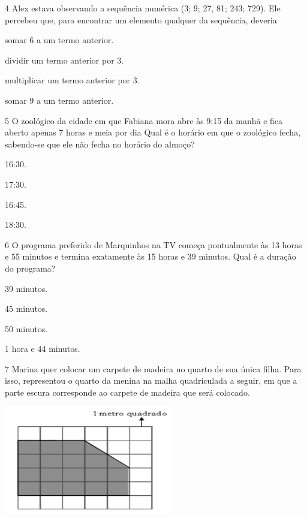 \begin{mdframed}[linewidth=2pt,linecolor=salmao,roundcorner=2pt]
\begin{escolha}
{\begin{escolha}
\num{4} Alex estava observando a sequência numérica (3; 9; 27, 81; 243; 729).
Ele percebeu que, para encontrar um elemento qualquer da sequência,
deveria

\begin{escolha}
\item
  somar 6 a um termo anterior.
\item
  dividir um termo anterior por 3.
\item
  multiplicar um termo anterior por 3.
\item
  somar 9 a um termo anterior.
\end{escolha}


\num{5} O zoológico da cidade em que Fabiana mora abre às 9:15 da manhã e fica
aberto apenas 7 horas e meia por dia Qual é o horário em que o zoológico
fecha, sabendo-se que ele não fecha no horário do almoço?

\begin{escolha}
\item
  16:30.
\item
  17:30.
\item
  16:45.
\item
  18:30.
\end{escolha}


\num{6} O programa preferido de Marquinhos na TV começa pontualmente às 13
horas e 55 minutos e termina exatamente às 15 horas e 39 minutos. Qual é a
duração do programa?

\begin{escolha}
\item
  39 minutos.
\item
  45 minutos.
\item
  50 minutos.
\item
  1 hora e 44 minutos.
\end{escolha}


\num{7} Marina quer colocar um carpete de madeira no quarto de sua única filha.
Para isso, representou o quarto da menina na malha quadriculada a seguir, em que a parte escura corresponde ao carpete de madeira que será
colocado.

\includegraphics[width=2.90385in,height=1.84662in]{media/image160.png}


\end{escolha}}
\end{escolha}
\end{mdframed}
